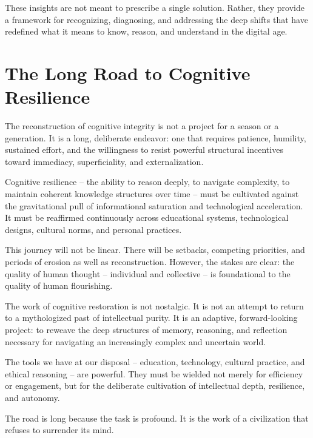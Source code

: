 These insights are not meant to prescribe a single solution. Rather, they
provide a framework for recognizing, diagnosing, and addressing the deep shifts
that have redefined what it means to know, reason, and understand in the digital
age.



\section{The Long Road to Cognitive Resilience}

The reconstruction of cognitive integrity is not a project for a season or a
generation. It is a long, deliberate endeavor: one that requires patience,
humility, sustained effort, and the willingness to resist powerful structural
incentives toward immediacy, superficiality, and externalization.

Cognitive resilience -- the ability to reason deeply, to navigate complexity, to
maintain coherent knowledge structures over time -- must be cultivated against
the gravitational pull of informational saturation and technological
acceleration. It must be reaffirmed continuously across educational systems,
technological designs, cultural norms, and personal practices.

This journey will not be linear. There will be setbacks, competing priorities,
and periods of erosion as well as reconstruction. However, the stakes are clear:
the quality of human thought -- individual and collective -- is foundational to
the quality of human flourishing.

The work of cognitive restoration is not nostalgic. It is not an attempt to
return to a mythologized past of intellectual purity. It is an adaptive,
forward-looking project: to reweave the deep structures of memory, reasoning,
and reflection necessary for navigating an increasingly complex and uncertain
world.

The tools we have at our disposal -- education, technology, cultural practice,
and ethical reasoning -- are powerful. They must be wielded not merely for
efficiency or engagement, but for the deliberate cultivation of intellectual
depth, resilience, and autonomy.

The road is long because the task is profound. It is the work of a civilization
that refuses to surrender its mind.



